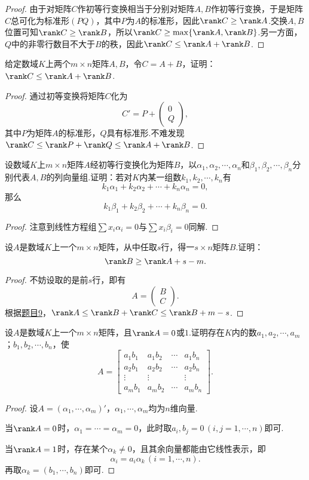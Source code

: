 \begin{proof}
	由于对矩阵$C$作初等行变换相当于分别对矩阵$A,B$作初等行变换，于是矩阵$C$总可化为标准形$(PQ)$，其中$P$为$A$的标准形，因此$\rank C\ge\rank A$.交换$A,B$位置可知$\rank C\ge\rank B$，所以$\rank C\ge\max\{\rank A,\rank B\}$.另一方面，$Q$中的非零行数目不大于$B$的秩，因此$\rank C\le\rank A+\rank B$.
\end{proof}
\begin{prob}[10]
	给定数域$K$上两个$m\times n$矩阵$A,B$，令$C=A+B$，证明：$\rank C\le\rank A+\rank B$.
\end{prob}
\begin{proof}
	通过初等变换将矩阵$C$化为
	\[
		C'=P+\begin{pmatrix}
			0 \\Q
		\end{pmatrix},
	\]
	其中$P$为矩阵$A$的标准形，$Q$具有标准形.不难发现$\rank C\le\rank P+\rank Q\le\rank A+\rank B$.
\end{proof}
\begin{prob}[11]
	设数域$K$上$m\times n$矩阵$A$经初等行变换化为矩阵$B$，以$\alpha_1,\alpha_2,\cdots,\alpha_n$和$\beta_1,\beta_2,\cdots,\beta_n$分别代表$A,B$的列向量组.证明：若对$K$内某一组数$k_1,k_2,\cdots,k_n$有
	\[k_1\alpha_1+k_2\alpha_2+\cdots+k_n\alpha_n=0,\]
	那么
	\[k_1\beta_1+k_2\beta_2+\cdots+k_n\beta_n=0.\]
\end{prob}
\begin{proof}
	注意到线性方程组$\sum x_i\alpha_i=0$与$\sum x_i\beta_i=0$同解.
\end{proof}
\begin{prob}[12]
	设$A$是数域$K$上一个$m\times n$矩阵，从中任取$s$行，得一$s\times n$矩阵$B$.证明：
	\[\rank B\ge\rank A+s-m.\]
\end{prob}
\begin{proof}
	不妨设取的是前$s$行，即有
	\[
		A=\begin{pmatrix}
			B \\C
		\end{pmatrix}.
	\]
	根据\hyperlink{MatrixRankPartition}{题目9}，$\rank A\le\rank B+\rank C\le\rank B+m-s$.
\end{proof}
\begin{prob}[13]
	设$A$是数域$K$上一个$m\times n$矩阵，且$\rank A=0$或$1$.证明存在$K$内的数$a_1,a_2,\cdots,a_m$；$b_1,b_2,\cdots,b_n$，使
	\[A=
		\begin{bmatrix}
			a_1b_1 & a_1b_2 & \cdots & a_1b_n \\
			a_2b_1 & a_2b_2 & \cdots & a_2b_n \\
			\vdots & \vdots &        & \vdots \\
			a_mb_1 & a_mb_2 & \cdots & a_mb_n
		\end{bmatrix}.
	\]
\end{prob}
\begin{proof}
	设$A=(\alpha_1,\cdots,\alpha_m)'$，$\alpha_1,\cdots,\alpha_m$均为$n$维向量.

	当$\rank A=0$时，$\alpha_1=\cdots=\alpha_m=0$，此时取$a_i,b_j=0\,(i,j=1,\cdots,n)$即可.

	当$\rank A=1$时，存在某个$\alpha_k\ne0$，且其余向量都能由它线性表示，即
	\[\alpha_i=a_i\alpha_k\,(i=1,\cdots,n).\]
	再取$\alpha_k=(b_1,\cdots,b_n)$即可.
\end{proof}
